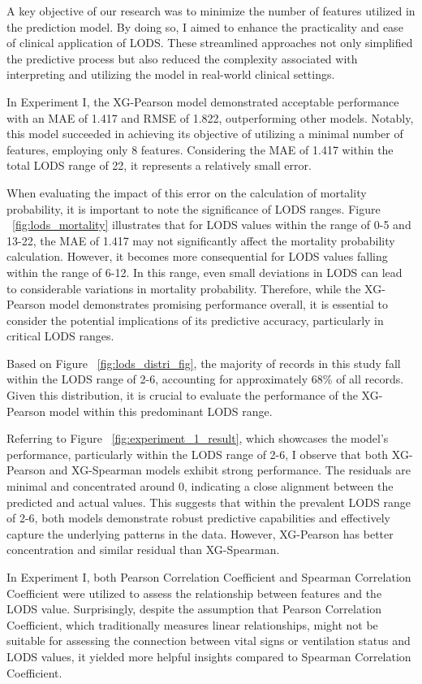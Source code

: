 \documentclass[12pt,a4paper,english
]{tunithesis}
\begin{document}
A key objective of our research was to minimize the number of features utilized in the prediction model. By doing so, I aimed to enhance the practicality and ease of clinical application of LODS. These streamlined approaches not only simplified the predictive process but also reduced the complexity associated with interpreting and utilizing the model in real-world clinical settings.

In Experiment I, the XG-Pearson model demonstrated acceptable performance with an MAE of 1.417 and RMSE of 1.822, outperforming other models. Notably, this model succeeded in achieving its objective of utilizing a minimal number of features, employing only 8 features. Considering the MAE of 1.417 within the total LODS range of 22, it represents a relatively small error.

When evaluating the impact of this error on the calculation of mortality probability, it is important to note the significance of LODS ranges. Figure ~\ref{fig:lods_mortality} illustrates that for LODS values within the range of 0-5 and 13-22, the MAE of 1.417 may not significantly affect the mortality probability calculation. However, it becomes more consequential for LODS values falling within the range of 6-12. In this range, even small deviations in LODS can lead to considerable variations in mortality probability. Therefore, while the XG-Pearson model demonstrates promising performance overall, it is essential to consider the potential implications of its predictive accuracy, particularly in critical LODS ranges. 

Based on Figure ~\ref{fig:lods_distri_fig}, the majority of records in this study fall within the LODS range of 2-6, accounting for approximately 68\% of all records. Given this distribution, it is crucial to evaluate the performance of the XG-Pearson model within this predominant LODS range.

Referring to Figure ~\ref{fig:experiment_1_result}, which showcases the model's performance, particularly within the LODS range of 2-6, I observe that both XG-Pearson and XG-Spearman models exhibit strong performance. The residuals are minimal and concentrated around 0, indicating a close alignment between the predicted and actual values. This suggests that within the prevalent LODS range of 2-6, both models demonstrate robust predictive capabilities and effectively capture the underlying patterns in the data. However, XG-Pearson has better concentration and similar residual than XG-Spearman.

In Experiment I, both Pearson Correlation Coefficient and Spearman Correlation Coefficient were utilized to assess the relationship between features and the LODS value. Surprisingly, despite the assumption that Pearson Correlation Coefficient, which traditionally measures linear relationships, might not be suitable for assessing the connection between vital signs or ventilation status and LODS values, it yielded more helpful insights compared to Spearman Correlation Coefficient.
\end{document}
